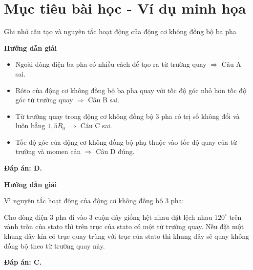 \section{Mục tiêu bài học - Ví dụ minh họa}
\begin{dang}{Ghi nhớ cấu tạo và nguyên tắc hoạt động của động cơ không đồng bộ ba pha}
	{	\begin{center}
			\textbf{Hướng dẫn giải}
		\end{center}
		
		\begin{itemize}
			\item Ngoài dòng điện ba pha có nhiều cách để tạo ra từ trường quay $\Rightarrow $ Câu A sai.
			\item Rôto của động cơ không đồng bộ ba pha quay với tốc độ góc nhỏ hơn tốc độ góc từ trường quay $\Rightarrow $ Câu B sai.
			\item Từ trường quay trong động cơ không đồng bộ 3 pha có trị số không đổi và luôn bằng $ 1,5B_0$ $\Rightarrow $ Câu C sai.
			\item Tốc độ góc của động cơ không đồng bộ phụ thuộc vào tốc độ quay của từ trường và momen cản $\Rightarrow$ Câu D đúng.
		\end{itemize}
		
		\textbf{Đáp án: D.}
	}
	{	\begin{center}
			\textbf{Hướng dẫn giải}
		\end{center}
		
		Vì nguyên tắc hoạt động của động cơ không đồng bộ 3 pha: 
		
		Cho dòng điện 3 pha đi vào 3 cuộn dây giống hệt nhau đặt lệch nhau $120^\circ$ trên vành tròn của stato thì trên trục của stato có một từ trường quay. Nếu đặt một khung dây kín có trục quay trùng với trục của stato thì khung dây sẽ quay không đồng bộ theo từ trường quay này.
		
		\textbf{Đáp án: C.}
	}
\end{dang}
